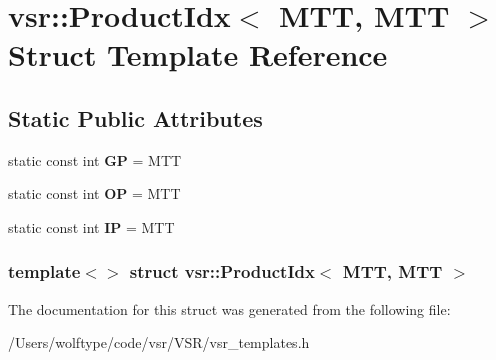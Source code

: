 \hypertarget{structvsr_1_1_product_idx_3_01_m_t_t_00_01_m_t_t_01_4}{\section{vsr\-:\-:Product\-Idx$<$ M\-T\-T, M\-T\-T $>$ Struct Template Reference}
\label{structvsr_1_1_product_idx_3_01_m_t_t_00_01_m_t_t_01_4}
}
\subsection*{Static Public Attributes}
\begin{DoxyCompactItemize}
\item 
\hypertarget{structvsr_1_1_product_idx_3_01_m_t_t_00_01_m_t_t_01_4_aab4c275564f7e477eb46ecc727260335}{static const int {\bfseries G\-P} = M\-T\-T}\label{structvsr_1_1_product_idx_3_01_m_t_t_00_01_m_t_t_01_4_aab4c275564f7e477eb46ecc727260335}

\item 
\hypertarget{structvsr_1_1_product_idx_3_01_m_t_t_00_01_m_t_t_01_4_ae5f86338404b203532b391f7aa124421}{static const int {\bfseries O\-P} = M\-T\-T}\label{structvsr_1_1_product_idx_3_01_m_t_t_00_01_m_t_t_01_4_ae5f86338404b203532b391f7aa124421}

\item 
\hypertarget{structvsr_1_1_product_idx_3_01_m_t_t_00_01_m_t_t_01_4_a1fe244319228cc45ec80c744e487272b}{static const int {\bfseries I\-P} = M\-T\-T}\label{structvsr_1_1_product_idx_3_01_m_t_t_00_01_m_t_t_01_4_a1fe244319228cc45ec80c744e487272b}

\end{DoxyCompactItemize}
\subsubsection*{template$<$$>$ struct vsr\-::\-Product\-Idx$<$ M\-T\-T, M\-T\-T $>$}



The documentation for this struct was generated from the following file\-:\begin{DoxyCompactItemize}
\item 
/\-Users/wolftype/code/vsr/\-V\-S\-R/vsr\-\_\-templates.\-h\end{DoxyCompactItemize}
